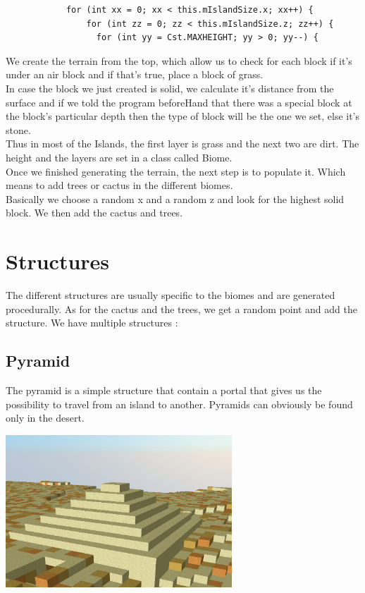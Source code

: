 \documentclass[article]{report}         %
\begin{document}
          \begin{lstlisting}  
            for (int xx = 0; xx < this.mIslandSize.x; xx++) {
                for (int zz = 0; zz < this.mIslandSize.z; zz++) {
                  for (int yy = Cst.MAXHEIGHT; yy > 0; yy--) {
          \end{lstlisting}

            We create the terrain from the top, which allow us to check for each block if it's under an air block and if that's true, place a block of grass.\\
            In case the block we just created is solid, we calculate it's distance from the surface and if we told the program beforeHand that there was a special block at the block's particular depth then the type of block will be the one we set, else it's stone.\\
            Thus in most of the Islands, the first layer is grass and the next two are dirt. The height and the layers are set in a class called Biome.\\

          Once we finished generating the terrain, the next step is to populate it. Which means to add trees or cactus in the different biomes.\\
          Basically we choose a random x and a random z and look for the highest solid block. We then add the cactus and trees.  
      \section{Structures}
          The different structures are usually specific to the biomes and are generated procedurally. As for the cactus and the trees, we get a random point and add the structure.
          We have multiple structures :
          \subsection{Pyramid}
            The pyramid is a simple structure that contain a portal that gives us the possibility to travel from an island to another. Pyramids can obviously be found only in the desert.
	\begin{center}
           	\includegraphics[width=8.5cm]{images/Pyramid.png}
          \end{center}
\end{document}
